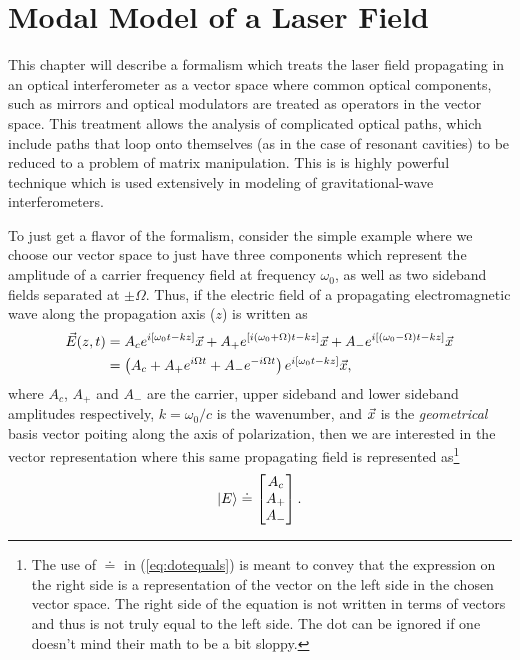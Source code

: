 

\chapter{Modal Model of a Laser Field}

This chapter will describe a formalism which treats the laser field propagating in an optical interferometer as a vector space where common optical components, such as mirrors and optical modulators are treated as operators in the vector space. %
This treatment allows the analysis of complicated optical paths, which include paths that loop onto themselves (as in the case of resonant cavities) to be reduced to a problem of matrix manipulation. %
This is is highly powerful technique which is used extensively in modeling of gravitational-wave interferometers.

To just get a flavor of the formalism, consider the simple example where we choose our vector space to just have three components which represent the amplitude of a carrier frequency field at frequency $\omega_0$, as well as two sideband fields separated at $\pm\Omega$. %
Thus, if the electric field of a propagating electromagnetic wave along the propagation axis ($z$) is written as
\begin{align*}
\vec{E}(z,t) &= A_c e^{i[\omega_0t -kz]}\vec{x} + A_+e^{[i(\omega_0+\Omega)t -kz]}\vec{x} + A_-e^{i[(\omega_0-\Omega)t -kz]}\vec{x}\\
&= \left( A_c + A_+ e^{i\Omega t}+A_-e^{-i\Omega t}\right) e^{i[\omega_0 t-kz]}\vec{x},
\end{align*}
where $A_c$, $A_+$ and $A_-$ are the carrier, upper sideband and lower sideband amplitudes respectively, $k=\omega_0/c$ is the wavenumber, and $\vec{x}$ is the \emph{geometrical} basis vector poiting along the axis of polarization, then we are interested in the vector representation where this same propagating field is represented as\footnote{The use of $\doteq$ in (\ref{eq:dotequals}) is meant to convey that the expression on the right side is a representation of the vector on the left side in the chosen vector space. %
The right side of the equation is not written in terms of vectors and thus is not truly equal to the left side. %
The dot can be ignored if one doesn't mind their math to be a bit sloppy.} 
\begin{equation}
\label{eq:dotequals}
\left| E \right> \doteq \left[\begin{matrix} A_c \\ A_+ \\ A_- \end{matrix}\right].
\end{equation}

